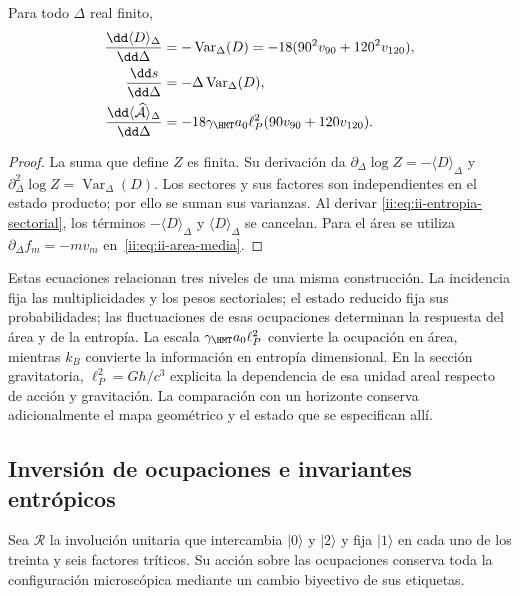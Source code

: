 \begin{proposition}
Para todo $\Delta$ real finito,
\begin{align}
 \frac{\dd\langle D\rangle_\Delta}{\dd\Delta}
 &=-\operatorname{Var}_\Delta(D)
   =-18(90^2v_{90}+120^2v_{120}),\\
 \frac{\dd s}{\dd\Delta}
 &=-\Delta\operatorname{Var}_\Delta(D),
 \label{ii:eq:ii-respuesta-entropica}\\
 \frac{\dd\langle\widehat{\mathcal A}\rangle_\Delta}{\dd\Delta}
 &=-18\gamma_{\HMT}a_0\ell_P^2(90v_{90}+120v_{120}).
 \label{ii:eq:ii-respuesta-areal}
\end{align}
\end{proposition}
\begin{proof}
La suma que define $Z$ es finita. Su derivación da
$\partial_\Delta\log Z=-\langle D\rangle_\Delta$ y
$\partial_\Delta^2\log Z=\operatorname{Var}_\Delta(D)$.
Los sectores y sus factores son independientes en el estado producto;
por ello se suman sus varianzas. Al derivar
\eqref{ii:eq:ii-entropia-sectorial}, los términos
$-\langle D\rangle_\Delta$ y $\langle D\rangle_\Delta$
se cancelan. Para el área se utiliza
$\partial_\Delta f_m=-mv_m$ en~\eqref{ii:eq:ii-area-media}.
\end{proof}

Estas ecuaciones relacionan tres niveles de una misma construcción.
La incidencia fija las multiplicidades y los pesos sectoriales; el
estado reducido fija sus probabilidades; las fluctuaciones de esas
ocupaciones determinan la respuesta del área y de la entropía.
La escala $\gamma_{\HMT}a_0\ell_P^2$ convierte la ocupación en área,
mientras $k_B$ convierte la información en entropía dimensional.
En la sección gravitatoria, $\ell_P^2=G\hbar/c^3$ explicita
la dependencia de esa unidad areal respecto de acción y gravitación.
La comparación con un horizonte conserva adicionalmente el mapa
geométrico y el estado que se especifican allí.

\subsection{Inversión de ocupaciones e invariantes entrópicos}
\label{ii:sec:ii-inversion-sectorial}

Sea $\mathcal R$ la involución unitaria que intercambia $|0\rangle$
y $|2\rangle$ y fija $|1\rangle$ en cada uno de los treinta y seis
factores tríticos. Su acción sobre las ocupaciones conserva toda la
configuración microscópica mediante un cambio biyectivo de sus etiquetas.

